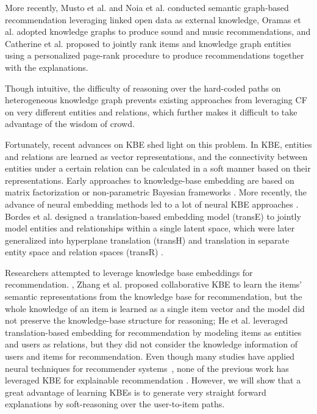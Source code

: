 \documentclass[algorithms,article,accept,moreauthors,pdftex,10pt,a4paper]{Definitions/mdpi}
\begin{document}
More recently, Musto et al. \cite{musto2016semantics} and Noia et al. \cite{noia2016sprank} conducted semantic graph-based recommendation leveraging linked open data as external knowledge, Oramas et al. \cite{oramas2017sound} adopted knowledge graphs to produce sound and music recommendations, and Catherine et al. \cite{catherine2017explainable} proposed to jointly rank items and knowledge graph entities using a personalized page-rank procedure to produce recommendations together with the explanations.

Though intuitive, the difficulty of reasoning over the hard-coded paths on heterogeneous knowledge graph prevents existing approaches from leveraging CF on very different entities and relations, which further makes it difficult to take advantage of the wisdom of crowd. 

Fortunately, recent advances on KBE shed light on this problem. In KBE, entities and relations are learned as vector representations, and the connectivity between entities under a certain relation can be calculated in a soft manner based on their representations. Early approaches to knowledge-base embedding are based on matrix factorization \cite{nickel2011three,singh2008relational} or non-parametric Bayesian frameworks \cite{miller2009nonparametric,zhu2012max}. More recently, the advance of neural embedding methods led to a lot of neural KBE approaches \cite{bordes2011learning}. 
Bordes et al. \cite{bordes2013translating} designed a translation-based embedding model (transE) to jointly model entities and relationships within a single latent space, which were later generalized into hyperplane translation (transH) \cite{wang2014knowledge} and translation in separate entity space and relation spaces (transR) \cite{lin2015learning}.

Researchers attempted to leverage knowledge base embeddings for recommendation. , Zhang et al. \cite{zhang2016collaborativekdd} proposed collaborative KBE to learn the items' semantic representations from the knowledge base for recommendation, but the whole knowledge of an item is learned as a single item vector and the model did not preserve the knowledge-base structure for reasoning; He et al. \cite{he2017translation} leveraged translation-based embedding for recommendation by modeling items as entities and users as relations, but they did not consider the knowledge information of users and items for recommendation. 
Even though many studies have applied neural techniques for recommender systems~\cite{Li2015DeepCF, Wang:2015:CDL:2783258.2783273, Li:2017:CVA:3097983.3098077}, none of the previous work has leveraged KBE for explainable recommendation \cite{zhang2018explainable}. However, we will show that a great advantage of learning KBEs is to generate very straight forward explanations by soft-reasoning over the user-to-item paths.
\end{document}
